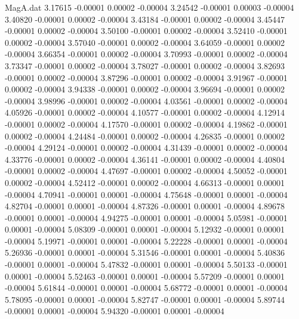 \begin{filecontents}{MagA.dat}
   3.17615   -0.00001    0.00002   -0.00004
   3.24542   -0.00001    0.00003   -0.00004
   3.40820   -0.00001    0.00002   -0.00004
   3.43184   -0.00001    0.00002   -0.00004
   3.45447   -0.00001    0.00002   -0.00004
   3.50100   -0.00001    0.00002   -0.00004
   3.52410   -0.00001    0.00002   -0.00004
   3.57040   -0.00001    0.00002   -0.00004
   3.64059   -0.00001    0.00002   -0.00004
   3.66354   -0.00001    0.00002   -0.00004
   3.70993   -0.00001    0.00002   -0.00004
   3.73347   -0.00001    0.00002   -0.00004
   3.78027   -0.00001    0.00002   -0.00004
   3.82693   -0.00001    0.00002   -0.00004
   3.87296   -0.00001    0.00002   -0.00004
   3.91967   -0.00001    0.00002   -0.00004
   3.94338   -0.00001    0.00002   -0.00004
   3.96694   -0.00001    0.00002   -0.00004
   3.98996   -0.00001    0.00002   -0.00004
   4.03561   -0.00001    0.00002   -0.00004
   4.05926   -0.00001    0.00002   -0.00004
   4.10577   -0.00001    0.00002   -0.00004
   4.12914   -0.00001    0.00002   -0.00004
   4.17570   -0.00001    0.00002   -0.00004
   4.19862   -0.00001    0.00002   -0.00004
   4.24484   -0.00001    0.00002   -0.00004
   4.26835   -0.00001    0.00002   -0.00004
   4.29124   -0.00001    0.00002   -0.00004
   4.31439   -0.00001    0.00002   -0.00004
   4.33776   -0.00001    0.00002   -0.00004
   4.36141   -0.00001    0.00002   -0.00004
   4.40804   -0.00001    0.00002   -0.00004
   4.47697   -0.00001    0.00002   -0.00004
   4.50052   -0.00001    0.00002   -0.00004
   4.52412   -0.00001    0.00002   -0.00004
   4.66313   -0.00001    0.00001   -0.00004
   4.70941   -0.00001    0.00001   -0.00004
   4.75648   -0.00001    0.00001   -0.00004
   4.82704   -0.00001    0.00001   -0.00004
   4.87326   -0.00001    0.00001   -0.00004
   4.89678   -0.00001    0.00001   -0.00004
   4.94275   -0.00001    0.00001   -0.00004
   5.05981   -0.00001    0.00001   -0.00004
   5.08309   -0.00001    0.00001   -0.00004
   5.12932   -0.00001    0.00001   -0.00004
   5.19971   -0.00001    0.00001   -0.00004
   5.22228   -0.00001    0.00001   -0.00004
   5.26936   -0.00001    0.00001   -0.00004
   5.31546   -0.00001    0.00001   -0.00004
   5.40836   -0.00001    0.00001   -0.00004
   5.47832   -0.00001    0.00001   -0.00004
   5.50133   -0.00001    0.00001   -0.00004
   5.52463   -0.00001    0.00001   -0.00004
   5.57209   -0.00001    0.00001   -0.00004
   5.61844   -0.00001    0.00001   -0.00004
   5.68772   -0.00001    0.00001   -0.00004
   5.78095   -0.00001    0.00001   -0.00004
   5.82747   -0.00001    0.00001   -0.00004
   5.89744   -0.00001    0.00001   -0.00004
   5.94320   -0.00001    0.00001   -0.00004

\end{filecontents}
